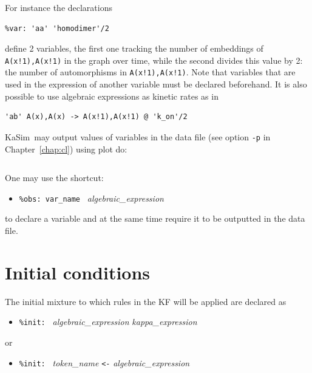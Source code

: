 \documentclass[11pt]{book}
\def\KaSim{\textsf{KaSim}}
\def\ttt#1{\texttt{#1}}
\def\noi{\noindent}
\def\ITE#1{\begin{itemize}#1\end{itemize}}
\begin{document}
\noi For instance the declarations
\begin{lstlisting}[language=kappa]
%var: 'homodimer' |A(x!1),A(x!1)|
%var: 'aa' 'homodimer'/2
\end{lstlisting}
define 2 variables, the first one tracking the number of embeddings of \ttt{A(x!1),A(x!1)} in the graph over time, while the second divides this value by 2: the number of automorphisms in \ttt{A(x!1),A(x!1)}. Note that variables that are used in the expression of another variable must be declared beforehand. 
\vskip 0.25cm
\noi It is also possible to use algebraic expressions as kinetic rates as in
\begin{lstlisting}[language=kappa]
%var: 'k_on' 1.0E-6 # per molecule per second
'ab' A(x),A(x) -> A(x!1),A(x!1) @ 'k_on'/2
\end{lstlisting}
\KaSim~may output values of variables in the data file (see option \ttt{-p} in Chapter~\ref{chap:cl}) using plot do:
\begin{lstlisting}[language=kappa]
%plot: 'var_name'
\end{lstlisting}
One may use the shortcut: 
\ITE{
\item[] \ttt{\%obs: {\textquotesingle}var\_name{\textquotesingle} } \textit{algebraic\_expression}}
to declare a variable and at the same time require it to be outputted in the data file. 

\section{Initial conditions}\label{sec:init}

The initial mixture to which rules in the KF will be applied are declared as
\ITE{
\item[] \ttt{\%init: } \textit{algebraic\_expression} \textit{kappa\_expression}
}
or
\ITE{
\item[] \ttt{\%init: }  \textit{token\_name} \ttt{<-} \textit{algebraic\_expression}
}
\end{document}
